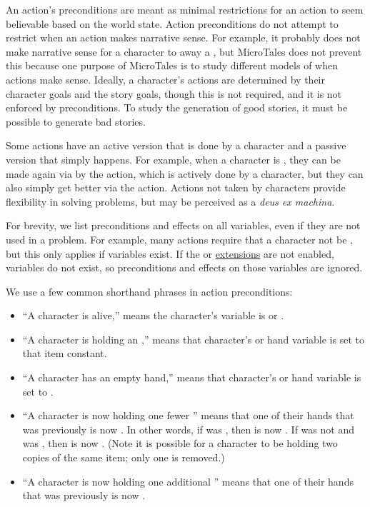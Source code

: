 \documentclass{nilreport}
\begin{document}
An action's preconditions are meant as minimal restrictions for an action to seem believable based on the world state. Action preconditions do not attempt to restrict when an action makes narrative sense. For example, it probably does not make narrative sense for a  character to  away a , but MicroTales does not prevent this because one purpose of MicroTales is to study different models of when actions make sense. Ideally, a character's actions are determined by their character goals and the story goals, though this is not required, and it is not enforced by preconditions. To study the generation of good stories, it must be possible to generate bad stories.

Some actions have an active version that is done by a character and a passive version that simply happens. For example, when a character is , they can be made  again via by the  action, which is actively done by a character, but they can also simply get better via the  action. Actions not taken by characters provide flexibility in solving problems, but may be perceived as a {\em deus ex machina}. 

For brevity, we list preconditions and effects on all variables, even if they are not used in a problem. For example, many actions require that a character not be , but this only applies if  variables exist. If the  or  \hyperref[sec:extensions]{extensions} are not enabled,  variables do not exist, so preconditions and effects on those variables are ignored.

We use a few common shorthand phrases in action preconditions:
\begin{itemize}
	\item ``A character is alive,'' means the character's  variable is  or .
	\item ``A character is holding an ,'' means that character's  or  hand variable is set to that item constant.
	\item ``A character has an empty hand,'' means that character's  or  hand variable is set to \None.
	\item ``A character is now holding one fewer '' means that one of their hands that was previously  is now \None. In other words, if  was , then  is now \None. If  was not  and  was , then  is now \None. (Note it is possible for a character to be holding two copies of the same item; only one is removed.)
	\item ``A character is now holding one additional '' means that one of their hands that was previously \None is now .
\end{itemize}
\end{document}

